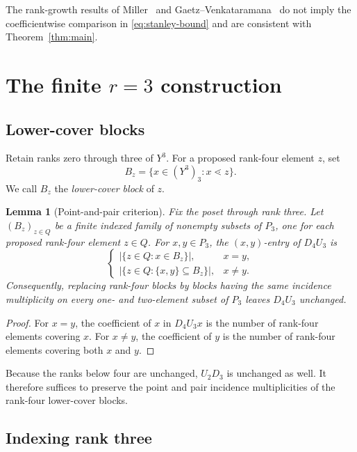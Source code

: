 \documentclass[10pt,a4paper]{amsart}
\newtheorem{lemma}[theorem]{Lemma}
\newcommand{\card}[1]{\lvert #1\rvert}
\begin{document}
The rank-growth results of Miller~\cite{Miller2013} and Gaetz--Venkataramana~\cite{GaetzVenkataramana2020} do not imply the coefficientwise comparison in \eqref{eq:stanley-bound} and are consistent with Theorem~\ref{thm:main}.

\section{The finite \texorpdfstring{$r=3$}{r=3} construction}\label{sec:r3-construction}

\subsection{Lower-cover blocks}

Retain ranks zero through three of $Y^3$. For a proposed rank-four element $z$, set
\[
  B_z=\{x\in(Y^3)_3:x\lessdot z\}.
\]
We call $B_z$ the \emph{lower-cover block} of $z$.


\begin{lemma}[Point-and-pair criterion]\label{lem:point-pair}
Fix the poset through rank three. Let $(B_z)_{z\in Q}$ be a finite indexed family of nonempty subsets of $P_3$, one for each proposed rank-four element $z\in Q$. For $x,y\in P_3$, the $(x,y)$-entry of $D_4U_3$ is
\[
  \begin{cases}
    \card{\{z\in Q:x\in B_z\}},&x=y,\\[2mm]
    \card{\{z\in Q:\{x,y\}\subseteq B_z\}},&x\neq y.
  \end{cases}
\]
Consequently, replacing rank-four blocks by blocks having the same incidence multiplicity on every one- and two-element subset of $P_3$ leaves $D_4U_3$ unchanged.
\end{lemma}

\begin{proof}
For $x=y$, the coefficient of $x$ in $D_4U_3x$ is the number of rank-four elements covering $x$. For $x\neq y$, the coefficient of $y$ is the number of rank-four elements covering both $x$ and $y$.
\end{proof}


Because the ranks below four are unchanged, $U_2D_3$ is unchanged as well. It therefore suffices to preserve the point and pair incidence multiplicities of the rank-four lower-cover blocks.

\subsection{Indexing rank three}
\end{document}
